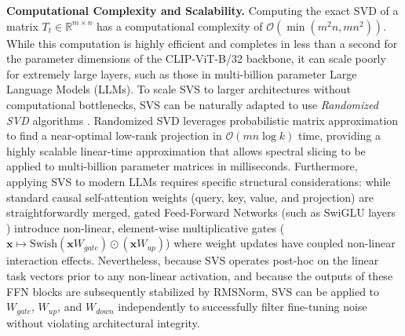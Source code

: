 \textbf{Computational Complexity and Scalability.} Computing the exact SVD of a matrix $T_t \in \mathbb{R}^{m \times n}$ has a computational complexity of $\mathcal{O}(\min(m^2 n, m n^2))$. While this computation is highly efficient and completes in less than a second for the parameter dimensions of the CLIP-ViT-B/32 backbone, it can scale poorly for extremely large layers, such as those in multi-billion parameter Large Language Models (LLMs). To scale SVS to larger architectures without computational bottlenecks, SVS can be naturally adapted to use \emph{Randomized SVD} algorithms \cite{halko2011randomizedsvd}. Randomized SVD leverages probabilistic matrix approximation to find a near-optimal low-rank projection in $\mathcal{O}(m n \log k)$ time, providing a highly scalable linear-time approximation that allows spectral slicing to be applied to multi-billion parameter matrices in milliseconds. Furthermore, applying SVS to modern LLMs requires specific structural considerations: while standard causal self-attention weights (query, key, value, and projection) are straightforwardly merged, gated Feed-Forward Networks (such as SwiGLU layers \cite{shazeer2020glu}) introduce non-linear, element-wise multiplicative gates ($\mathbf{x} \mapsto \text{Swish}(\mathbf{x} W_{gate}) \odot (\mathbf{x} W_{up})$) where weight updates have coupled non-linear interaction effects. Nevertheless, because SVS operates post-hoc on the linear task vectors prior to any non-linear activation, and because the outputs of these FFN blocks are subsequently stabilized by RMSNorm, SVS can be applied to $W_{gate}$, $W_{up}$, and $W_{down}$ independently to successfully filter fine-tuning noise without violating architectural integrity.

